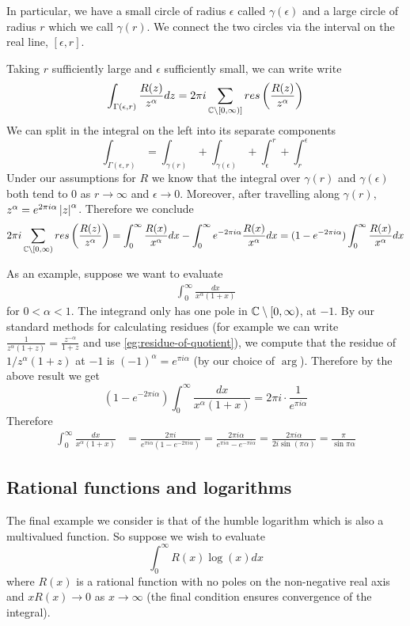 In particular, we have a small circle of radius $\epsilon$ called $\gamma(\epsilon)$ and a large circle of radius $r$ which we call $\gamma(r)$. We connect the two circles via the interval on the real line, $[\epsilon, r]$.

Taking $r$ sufficiently large and $\epsilon$ sufficiently small, we can write write
$$ \int_{\Gamma(\epsilon, r)} \frac{R(z)}{z^\alpha} dz = 2\pi i \sum_{\mathbb{C} \setminus [0, \infty)]} res \left( \frac{R(z)}{z^\alpha} \right) $$
We can split in the integral on the left into its separate components 
$$ \int_{\Gamma(\epsilon, r)}  = \int_{\gamma(r)}  + \int_{\gamma(\epsilon)} + \int_{\epsilon}^r  + \int_{r}^\epsilon $$
Under our assumptions for $R$ we know that the integral over $\gamma(r)$ and $\gamma(\epsilon)$ both tend to 0 as $r \to \infty$ and $\epsilon \to 0$. Moreover, after travelling along $\gamma(r)$, $z^\alpha = e^{2\pi i \alpha} \left|z\right|^\alpha$. Therefore we conclude 
\begin{align*}
    2\pi i \sum_{\mathbb{C} \setminus [0, \infty)} res \left( \frac{R(z)}{z^\alpha} \right) = \int_0^\infty \frac{R(x)}{x^\alpha} dx - \int_0^\infty e^{-2\pi i \alpha} \frac{R(x)}{x^\alpha} dx = (1 - e^{-2\pi i \alpha}) \int_0^\infty \frac{R(x)}{x^\alpha}dx
\end{align*}

As an example, suppose we want to evaluate
\begin{align*}
    \int_0^\infty \frac{dx}{x^\alpha (1 + x)}
\end{align*}
for $0 < \alpha < 1$. The integrand only has one pole in $\mathbb{C} \setminus [0, \infty)$, at $-1$. By our standard methods for calculating residues (for example we can write $\frac{1}{z^{\alpha}(1 + z)} = \frac{z^{-\alpha}}{1 + z}$ and use \autoref{eg:residue-of-quotient}), we compute that the residue of $1/z^\alpha(1 + z)$ at $-1$ is $(-1)^\alpha = e^{\pi i \alpha}$ (by our choice of $\arg$). Therefore by the above result we get
$$ (1 - e^{-2\pi i \alpha}) \int_0^\infty \frac{dx}{x^\alpha(1 + x)} = 2\pi i \cdot \frac{1}{e^{\pi i \alpha}} $$
Therefore
\begin{align*}
    \int_0^\infty \frac{dx}{x^\alpha(1 + x)} &= \frac{2\pi i}{e^{\pi i \alpha}(1 - e^{-2\pi i \alpha})} = \frac{2\pi i \alpha}{e^{\pi i \alpha} - e^{-\pi i \alpha}} = \frac{2 \pi i \alpha}{2i\sin(\pi \alpha)} = \frac{\pi}{\sin \pi \alpha}
\end{align*}

\subsection{Rational functions and logarithms}
The final example we consider is that of the humble logarithm which is also a multivalued function. So suppose we wish to evaluate
$$ \int_0^\infty R(x) \log(x) dx$$
where $R(x)$ is a rational function with no poles on the non-negative real axis and $xR(x) \to 0$ as $x \to \infty$ (the final condition ensures convergence of the integral). 

